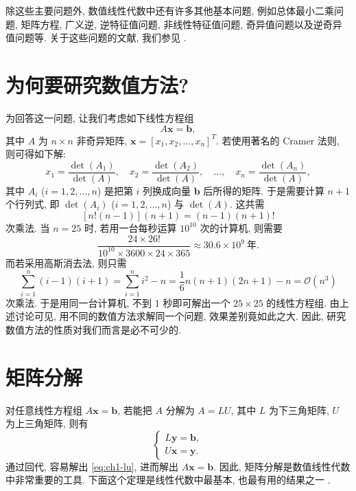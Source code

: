 除这些主要问题外, 数值线性代数中还有许多其他基本问题, 例如总体最小二乘问题, 矩阵方程, 广义逆, 逆特征值问题, 非线性特征值问题, 奇异值问题以及逆奇异值问题等. 关于这些问题的文献, 我们参见 \cite{src:3,src:6,src:13,src:26,src:27,src:53,src:72,src:73,src:76,src:84,src:86,src:88,src:100}.

\section{为何要研究数值方法?}
\label{sec:ch1-whynumerical}

为回答这一问题, 让我们考虑如下线性方程组
\[
  A\mathbf{x}=\mathbf{b},
\]
其中 $A$ 为 $n\times n$ 非奇异矩阵, $\mathbf{x}=[x_1,x_2,\ldots,x_n]^T$. 若使用著名的 Cramer 法则, 则可得如下解:
\[
  x_1=\frac{\det(A_1)}{\det(A)},\quad
  x_2=\frac{\det(A_2)}{\det(A)},\quad
  \ldots,\quad
  x_n=\frac{\det(A_n)}{\det(A)},
\]
其中 $A_i$ ($i=1,2,\ldots,n$) 是把第 $i$ 列换成向量 $\mathbf{b}$ 后所得的矩阵. 于是需要计算 $n+1$ 个行列式, 即 $\det(A_i)$ ($i=1,2,\ldots,n$) 与 $\det(A)$. 这共需
\[
  [n!(n-1)](n+1)=(n-1)(n+1)!
\]
次乘法. 当 $n=25$ 时, 若用一台每秒运算 $10^{10}$ 次的计算机, 则需要
\[
  \frac{24\times 26!}{10^{10}\times 3600\times 24\times 365}\approx 30.6\times 10^{9}\ \text{年}.
\]
而若采用高斯消去法, 则只需
\[
  \sum_{i=1}^{n}(i-1)(i+1)=\sum_{i=1}^{n}i^{2}-n=\frac{1}{6}n(n+1)(2n+1)-n=\mathcal{O}(n^{3})
\]
次乘法. 于是用同一台计算机, 不到 1 秒即可解出一个 $25\times 25$ 的线性方程组. 由上述讨论可见, 用不同的数值方法求解同一个问题, 效果差别竟如此之大. 因此, 研究数值方法的性质对我们而言是必不可少的.

\section{矩阵分解}
\label{sec:ch1-factorization}

对任意线性方程组 $A\mathbf{x}=\mathbf{b}$, 若能把 $A$ 分解为 $A=LU$, 其中 $L$ 为下三角矩阵, $U$ 为上三角矩阵, 则有
\begin{equation}
  \begin{cases}
    L\mathbf{y}=\mathbf{b},\\
    U\mathbf{x}=\mathbf{y}.
  \end{cases}
  \label{eq:ch1-lu}
\end{equation}
通过回代, 容易解出 \eqref{eq:ch1-lu}, 进而解出 $A\mathbf{x}=\mathbf{b}$. 因此, 矩阵分解是数值线性代数中非常重要的工具. 下面这个定理是线性代数中最基本, 也最有用的结果之一 \cite{src:39}.

